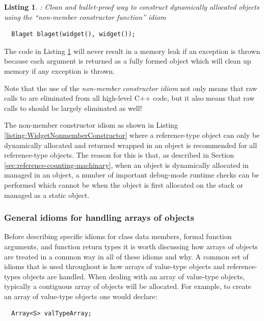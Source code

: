\documentclass[pdf,ps2pdf,11pt]{SANDreport}
\newtheorem{listing}{Listing}
\begin{document}
{}\begin{listing}: Clean and bullet-proof way to construct dynamically
allocated objects using the ``non-member constructor function'' idiom
\label{listing:BlagetConstruct3}
{\small\begin{verbatim}
  Blaget blaget(widget(), widget());
\end{verbatim}}
\end{listing}

The code in Listing {}\ref{listing:BlagetConstruct3} will never result
in a memory leak if an exception is thrown because each argument is
returned as a fully formed {} object which will clean up
memory if any exception is thrown.

Note that the use of the {}\textit{non-member constructor idiom} not
only means that raw calls to {} are eliminated from all
high-level C++ code, but it also means that raw calls to
{} should be largely eliminated as well!

The non-member constructor idiom as shown in Listing
{}\ref{listing:WidgetNonmemberConstructor} where a reference-type
object can only be dynamically allocated and returned wrapped in an
{} object is recommended for all reference-type objects.
The reason for this is that, as described in Section
{}\ref{sec:reference-counting-machinary}, when an object is
dynamically allocated in managed in an {} object, a number
of important debug-mode runtime checks can be performed which cannot
be when the object is first allocated on the stack or managed as a
static object.


%
{}\subsubsection{General idioms for handling arrays of objects}
%

Before describing specific idioms for class data members, formal
function arguments, and function return types it is worth discussing
how arrays of objects are treated in a common way in all of these
idioms and why.  A common set of idioms that is used throughout is how
arrays of value-type objects and reference-types objects are handled.
When dealing with an array of value-type objects, typically a
contiguous array of objects will be allocated.  For example, to create
an array of value-type objects one would declare:

{\small\begin{verbatim}
  Array<S> valTypeArray;
\end{verbatim}}
\end{document}
